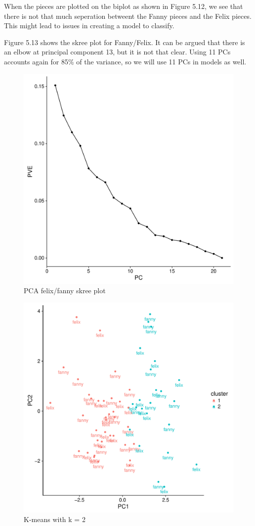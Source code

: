 \documentclass[12pt,twoside]{reedthesis}
\theoremstyle{definition}
\theoremstyle{definition}
\theoremstyle{definition}
\theoremstyle{remark}
\begin{document}
When the pieces are plotted on the biplot as shown in Figure 5.12, we
see that there is not that much seperation betweent the Fanny pieces and
the Felix pieces. This might lead to issues in creating a model to
classify.

Figure 5.13 shows the skree plot for Fanny/Felix. It can be argued that
there is an elbow at principal component 13, but it is not that clear.
Using 11 PCs accounts again for 85\% of the variance, so we will use 11
PCs in models as well.
\begin{figure}[H]
\centering
\includegraphics[scale = .5]{images/skree_f.pdf}
\caption{PCA felix/fanny skree plot}
\label{subd}
\end{figure}
\begin{figure}[H]
\centering
\includegraphics[scale = .5]{images/kmeans_2_f.pdf}
\caption{K-means with k = 2}
\label{subd}
\end{figure}
\end{document}
